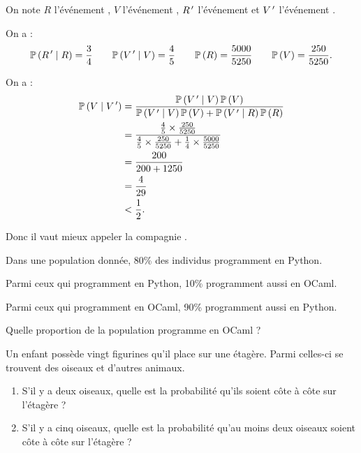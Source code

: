 \begin{corr}
On note \(R\) l'événement , \(V\) l'événement , \(R^{\,\prime}\) l'événement  et \(V^{\,\prime}\) l'événement .

On a : \[\mathbb{P}\left(R^{\,\prime}\mid R\right)=\dfrac{3}{4}\qquad\mathbb{P}\left(V^{\,\prime}\mid V\right)=\dfrac{4}{5}\qquad\mathbb{P}\left(R\right)=\dfrac{5000}{5250}\qquad\mathbb{P}\left(V\right)=\dfrac{250}{5250}.\]

On a : \[\begin{aligned}
\mathbb{P}\left(V\mid V^{\,\prime}\right)&=\dfrac{\mathbb{P}\left(V^{\,\prime}\mid V\right)\mathbb{P}\left(V\right)}{\mathbb{P}\left(V^{\,\prime}\mid V\right)\mathbb{P}\left(V\right)+\mathbb{P}\left(V^{\,\prime}\mid R\right)\mathbb{P}\left(R\right)} \\
&=\dfrac{\frac{4}{5}\times\frac{250}{5250}}{\frac{4}{5}\times\frac{250}{5250}+\frac{1}{4}\times\frac{5000}{5250}} \\
&=\dfrac{200}{200+1250} \\
&=\dfrac{4}{29} \\
&<\dfrac{1}{2}.
\end{aligned}\]

Donc il vaut mieux appeler la compagnie .
\end{corr}

\begin{exo}[Exercice 5]
Dans une population donnée, 80\% des individus programment en Python.

Parmi ceux qui programment en Python, 10\% programment aussi en OCaml.

Parmi ceux qui programment en OCaml, 90\% programment aussi en Python.

Quelle proportion de la population programme en OCaml ?
\end{exo}

\begin{corr}
\end{corr}

\begin{exo}
Un enfant possède vingt figurines qu'il place sur une étagère. Parmi celles-ci se trouvent des oiseaux et d'autres animaux.

\begin{enumerate}
    \item S'il y a deux oiseaux, quelle est la probabilité qu'ils soient côte à côte sur l'étagère ? \\
    \item S'il y a cinq oiseaux, quelle est la probabilité qu'au moins deux oiseaux soient côte à côte sur l'étagère ?
\end{enumerate}
\end{exo}

